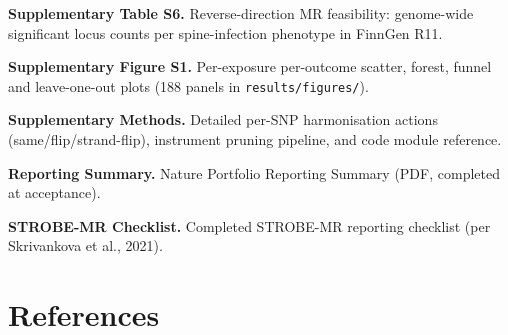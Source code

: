 \documentclass[11pt]{article}
\begin{document}
\textbf{Supplementary Table S6.} Reverse-direction MR feasibility: genome-wide significant locus counts per spine-infection phenotype in FinnGen R11.

\textbf{Supplementary Figure S1.} Per-exposure \times  per-outcome scatter, forest, funnel and leave-one-out plots (188 panels in \texttt{results/figures/}).

\textbf{Supplementary Methods.} Detailed per-SNP harmonisation actions (same/flip/strand-flip), instrument pruning pipeline, and code module reference.

\textbf{Reporting Summary.} Nature Portfolio Reporting Summary (PDF, completed at acceptance).

\textbf{STROBE-MR Checklist.} Completed STROBE-MR reporting checklist (per Skrivankova et al., 2021).

\section*{References}
\end{document}
